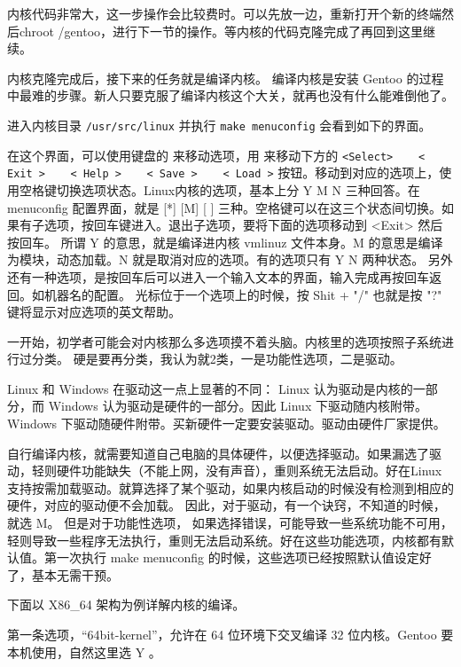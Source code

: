 内核代码非常大，这一步操作会比较费时。可以先放一边，重新打开个新的终端然后chroot /gentoo，进行下一节的操作。等内核的代码克隆完成了再回到这里继续。

内核克隆完成后，接下来的任务就是编译内核。 编译内核是安装 Gentoo 的过程中最难的步骤。新人只要克服了编译内核这个大关，就再也没有什么能难倒他了。

进入内核目录 \texttt{/usr/src/linux} 并执行 \texttt{make menuconfig} 会看到如下的界面。


在这个界面，可以使用键盘的  \textuparrow\textdownarrow 来移动选项，用 \textleftarrow\textrightarrow 来移动下方的 \verb|<Select>    < Exit >    < Help >    < Save >    < Load >| 按钮。移动到对应的选项上，使用空格键切换选项状态。Linux内核的选项，基本上分 Y M N 三种回答。在 menuconfig 配置界面，就是 [*] [M] [ ] 三种。空格键可以在这三个状态间切换。如果有子选项，按回车键进入。退出子选项，要将下面的选项移动到 <Exit> 然后按回车。
所谓 Y 的意思，就是编译进内核 vmlinuz 文件本身。M 的意思是编译为模块，动态加载。N 就是取消对应的选项。有的选项只有 Y N 两种状态。 另外还有一种选项，是按回车后可以进入一个输入文本的界面，输入完成再按回车返回。如机器名的配置。
光标位于一个选项上的时候，按 Shit + "/" 也就是按 "?" 键将显示对应选项的英文帮助。

一开始，初学者可能会对内核那么多选项摸不着头脑。内核里的选项按照子系统进行过分类。
硬是要再分类，我认为就2类，一是功能性选项，二是驱动。

\begin{notice}
Linux 和 Windows 在驱动这一点上显著的不同： Linux 认为驱动是内核的一部分，而 Windows 认为驱动是硬件的一部分。因此 Linux 下驱动随内核附带。 Windows 下驱动随硬件附带。买新硬件一定要安装驱动。驱动由硬件厂家提供。
\end{notice}

自行编译内核，就需要知道自己电脑的具体硬件，以便选择驱动。如果漏选了驱动，轻则硬件功能缺失（不能上网，没有声音），重则系统无法启动。好在Linux支持按需加载驱动。就算选择了某个驱动，如果内核启动的时候没有检测到相应的硬件，对应的驱动便不会加载。
因此，对于驱动，有一个诀窍，不知道的时候，就选 M。 但是对于功能性选项， 如果选择错误，可能导致一些系统功能不可用，轻则导致一些程序无法执行，重则无法启动系统。好在这些功能选项，内核都有默认值。第一次执行 make menuconfig 的时候，这些选项已经按照默认值设定好了，基本无需干预。

下面以 X86\_64 架构为例详解内核的编译。


第一条选项，“64bit-kernel”，允许在 64 位环境下交叉编译 32 位内核。Gentoo 要本机使用，自然这里选 Y 。

